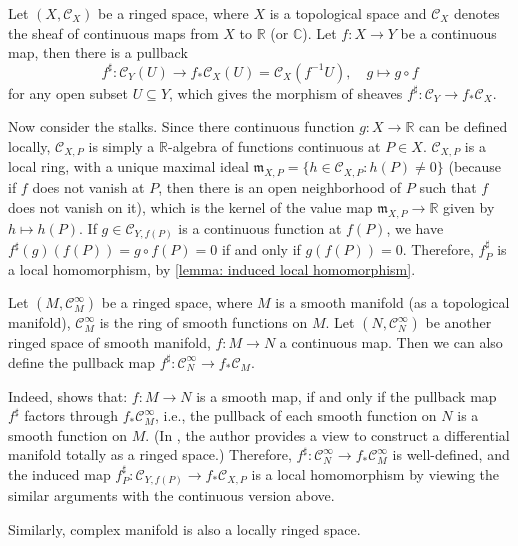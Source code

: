 \documentclass[11pt]{article}
\begin{document}
\begin{example}
  Let $ (X,\mathscr{C}_{X}) $ be a ringed space, 
  where $ X $ is a topological space and $ \mathscr{C}_{X} $ 
  denotes the sheaf of continuous maps from $ X $ to $ \mathbb{R} $ 
  (or $ \mathbb{C} $). 
  Let $ f: X \to Y $ be a continuous map, then there is a pullback  
  $$f^{\sharp}: \mathscr{C}_{Y}(U) \to f_{*}\mathscr{C}_{X}(U) = 
  \mathscr{C}_{X}(f^{-1}U), \quad g \mapsto g \circ f$$ 
  for any open subset $ U \subseteq Y $, 
  which gives the morphism of sheaves 
  $ f^{\sharp} :\mathscr{C}_{Y} \to  f_{*}\mathscr{C}_{X} $. 

  Now consider the stalks. Since there continuous function 
  $ g: X \to \mathbb{R} $ can be defined locally, 
  $ \mathscr{C}_{X,P} $ is simply a $ \mathbb{R} $-algebra 
  of functions continuous at $ P \in X $. 
  $ \mathscr{C}_{X,P} $ is a local ring, with a unique maximal 
  ideal $ \mathfrak{m}_{X,P}=\{h \in \mathscr{C}_{X,P}: h(P) \neq 0\} $ 
  (because if $ f $ does not vanish at $ P $, then there is an 
  open neighborhood of $ P $ such that $ f $ does not vanish on it), 
  which is the kernel of the value map 
  $ \mathfrak{m}_{X,P} \to \mathbb{R} $ given by $ h \mapsto h(P) $. 
  If $ g \in \mathscr{C}_{Y,f(P)} $ is a continuous 
  function at $ f(P) $, we have 
  $ f^{\sharp}(g)(f(P)) = g \circ f(P) =0 $ if and only if 
  $ g(f(P))=0 $. Therefore, $ f^{\sharp}_{P} $ is a local homomorphism, 
  by \autoref{lemma: induced local homomorphism}. 
\end{example}

\begin{example}
  Let $ (M,\mathscr{C}^{\infty}_{M}) $ be a ringed space, 
  where $ M $ is a smooth manifold (as a topological manifold), 
  $ \mathscr{C}^{\infty}_{M} $ is the ring of smooth functions 
  on $ M $. Let $ (N,\mathscr{C}^{\infty}_{N}) $ be another 
  ringed space of smooth manifold, $ f: M \to N $ a continuous map. 
  Then we can also define the pullback map 
  $ f^{\sharp}: \mathscr{C}^{\infty}_{N} \to f_{*}\mathscr{C}_{M} $. 

  Indeed, \cite[Proposition 4.18]{WedhornManifolds} shows that: 
  $ f: M \to N $ is a smooth map, if and only if 
  the pullback map $ f^{\sharp} $ factors through $ f_{*}\mathscr{C}_{M}^{\infty} $, 
  i.e., the pullback of each smooth function on $ N $ is a smooth function on $ M $. 
  (In \cite{WedhornManifolds}, the author provides a view to construct a differential 
  manifold totally as a ringed space.) Therefore, 
  $ f^{\sharp}: \mathscr{C}^{\infty}_{N} \to f_{*}\mathscr{C}_{M}^{\infty} $ is well-defined, 
  and the induced map $ f^{\sharp}_{P}:\mathscr{C}_{Y,f(P)} \to  f_{*}\mathscr{C}_{X,P}  $ 
  is a local homomorphism by viewing the similar arguments with the continuous version above. 

  Similarly, complex manifold is also a locally ringed space. 
\end{example}
\end{document}
